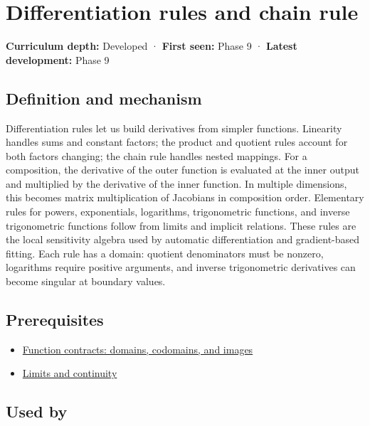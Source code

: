 \hypertarget{appendix-d9f70bdfbc92}{}\label{referencestart:appendix-d9f70bdfbc92}
\section{Differentiation rules and chain rule}\label{appendix-d9f70bdfbc92-differentiation-rules-and-chain-rule}

\textbf{Curriculum depth:} Developed · \textbf{First seen:} Phase 9 · \textbf{Latest development:} Phase 9

\subsection{Definition and mechanism}\label{appendix-d9f70bdfbc92-definition-and-mechanism}

Differentiation rules let us build derivatives from simpler functions. Linearity handles sums and constant factors; the product and quotient rules account for both factors changing; the chain rule handles nested mappings. For a composition, the derivative of the outer function is evaluated at the inner output and multiplied by the derivative of the inner function. In multiple dimensions, this becomes matrix multiplication of Jacobians in composition order. Elementary rules for powers, exponentials, logarithms, trigonometric functions, and inverse trigonometric functions follow from limits and implicit relations. These rules are the local sensitivity algebra used by automatic differentiation and gradient-based fitting. Each rule has a domain: quotient denominators must be nonzero, logarithms require positive arguments, and inverse trigonometric derivatives can become singular at boundary values.

\subsection{Prerequisites}\label{appendix-d9f70bdfbc92-prerequisites}

\begin{itemize}
\tightlist
\item
  \hyperref[appendix-a59658325cd6]{Function contracts: domains, codomains, and images}
\item
  \hyperref[appendix-fecc1847f5a3]{Limits and continuity}
\end{itemize}

\subsection{Used by}\label{appendix-d9f70bdfbc92-used-by}

